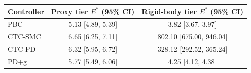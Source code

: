 \begin{tabular}{lcc}
\toprule
Controller & Proxy tier $E^{*}$ (95\% CI) & Rigid-body tier $E^{*}$ (95\% CI) \\
\midrule
PBC     & 5.13 [4.89, 5.39] & 3.82 [3.67, 3.97] \\
CTC-SMC & 6.65 [6.25, 7.11] & 802.10 [675.00, 946.04] \\
CTC-PD  & 6.32 [5.95, 6.72] & 328.12 [292.52, 365.24] \\
PD+g    & 5.77 [5.49, 6.06] & 4.25 [4.12, 4.38] \\
\bottomrule
\end{tabular}
